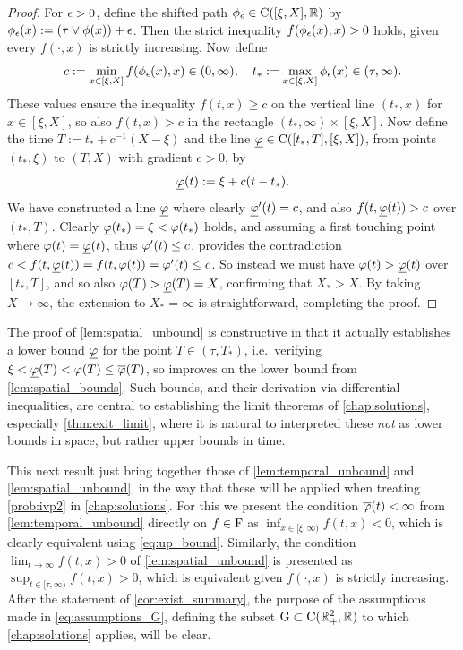 \begin{proof}
    For $\epsilon>0$, define the shifted path $\phi_\epsilon\in\mathrm{C}([\xi,X],\mathbb{R})$ by $\phi_\epsilon(x):=(\tau\vee \phi(x))+\epsilon$. Then the strict inequality $f(\phi_\epsilon(x),x)>0$ holds, given every $f(\cdot,x)$ is strictly increasing. Now define
    \begin{equation}
        c:=\min_{x\in[\xi,X]} f(\phi_\epsilon(x),x)\in(0,\infty),\quad t_*:= \max_{x\in[\xi,X]}\phi_\epsilon(x) \in (\tau,\infty).
    \end{equation}
    These values ensure the inequality $f(t,x)\ge c$ on the vertical line $(t_*,x)$ for $x\in[\xi,X]$, so also $f(t,x)> c$ in the rectangle $(t_*,\infty)\times[\xi,X]$. Now define the time $T:=t_* + c^{-1}(X-\xi)$ and the line $\underline{\varphi}\in\mathrm{C}([t_*,T],[\xi,X])$, from points $(t_*,\xi)$ to $(T,X)$ with gradient $c>0$, by
    \begin{equation}
        \underline{\varphi}(t):= \xi + c(t - t_*).
    \end{equation}
    We have constructed a line $\underline{\varphi}$ where clearly $\underline{\varphi}'(t)=c$, and also $f(t,\underline{\varphi}(t))>c$ over $(t_*,T)$. Clearly $\underline{\varphi}(t_*)=\xi<\varphi(t_*)$ holds, and assuming a first touching point where $\varphi(t)=\underline{\varphi}(t)$, thus $\varphi'(t)\le c$, provides the contradiction $c<f(t,\underline{\varphi}(t))=f(t,\varphi(t))=\varphi'(t)\le c$. So instead we must have $\varphi(t)>\underline{\varphi}(t)$ over $[t_*,T]$, and so also $\varphi(T)>\underline{\varphi}(T)=X$, confirming that $X_*>X$. By taking $X\to\infty$, the extension to $X_*=\infty$ is straightforward, completing the proof.
\end{proof}

The proof of \autoref{lem:spatial_unbound} is constructive in that it actually establishes a lower bound $\underline{\varphi}$ for the point $T\in(\tau,T_*)$, i.e.~verifying $\xi<\underline{\varphi}(T)<\varphi(T)\le\overline{\varphi}(T)$, so improves on the lower bound from \autoref{lem:spatial_bounds}. Such bounds, and their derivation via differential inequalities, are central to establishing the limit theorems of \autoref{chap:solutions}, especially \autoref{thm:exit_limit}, where it is natural to interpreted these \emph{not} as lower bounds in space, but rather upper bounds in time.

This next result just bring together those of \autoref{lem:temporal_unbound} and \autoref{lem:spatial_unbound}, in the way that these will be applied when treating \autoref{prob:ivp2} in \autoref{chap:solutions}. For this we present the condition $\overline{\varphi}(t)<\infty$ from \autoref{lem:temporal_unbound} directly on $f\in\mathrm{F}$ as $\inf_{x\in[\xi,\infty)}f(t,x)<0$, which is clearly equivalent using \autoref{eq:up_bound}. Similarly, the condition $\lim_{t\to\infty}f(t,x)>0$ of \autoref{lem:spatial_unbound} is presented as $\sup_{t\in[\tau,\infty)}f(t,x)>0$, which is equivalent given $f(\cdot,x)$ is strictly increasing. After the statement of \autoref{cor:exist_summary}, the purpose of the assumptions made in \autoref{eq:assumptions_G}, defining the subset $\mathrm{G}\subset\mathrm{C}(\mathbb{R}^2_+,\mathbb{R})$ to which \autoref{chap:solutions} applies, will be clear.


